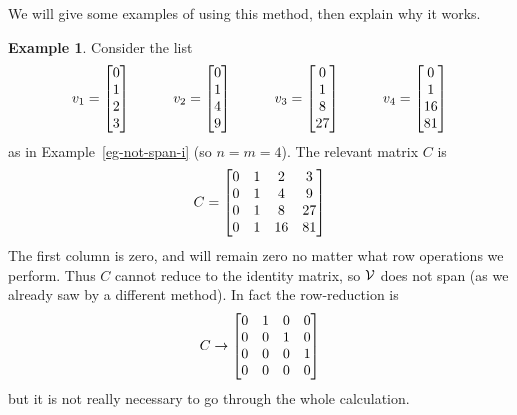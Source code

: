 \documentclass[reqno]{amsart}
\theoremstyle{definition}
\newtheorem{example}[theorem]{Example}
\begin{document}
We will give some examples of using this method, then explain why it
works.
\begin{example}\label{eg-not-span-i-matrix}
 Consider the list
 \[ v_1 = \left[\begin{matrix} 0 \\ 1 \\  2 \\  3 \end{matrix}\right] \hspace{3em}
    v_2 = \left[\begin{matrix} 0 \\ 1 \\  4 \\  9 \end{matrix}\right] \hspace{3em}
    v_3 = \left[\begin{matrix} 0 \\ 1 \\  8 \\ 27 \end{matrix}\right] \hspace{3em}
    v_4 = \left[\begin{matrix} 0 \\ 1 \\ 16 \\ 81 \end{matrix}\right]
 \]
 as in Example~\ref{eg-not-span-i} (so $n=m=4$).  The relevant matrix
 $C$ is
 \[ C   = \left[\begin{matrix}
           0 & 1 &  2 &  3 \\
           0 & 1 &  4 &  9 \\
           0 & 1 &  8 & 27 \\
           0 & 1 & 16 & 81
          \end{matrix}\right]
 \]
 The first column is zero, and will remain zero no matter what row
 operations we perform.  Thus $C$ cannot reduce to the identity
 matrix, so $\mathcal{V}$ does not span (as we already saw by a different
 method).  In fact the row-reduction is
 \[ C \to \left[\begin{matrix} 0 & 1 & 0 & 0 \\
               0 & 0 & 1 & 0 \\
               0 & 0 & 0 & 1 \\
               0 & 0 & 0 & 0 \end{matrix}\right]
 \]
 but it is not really necessary to go through the whole calculation.
\end{example}
\end{document}
